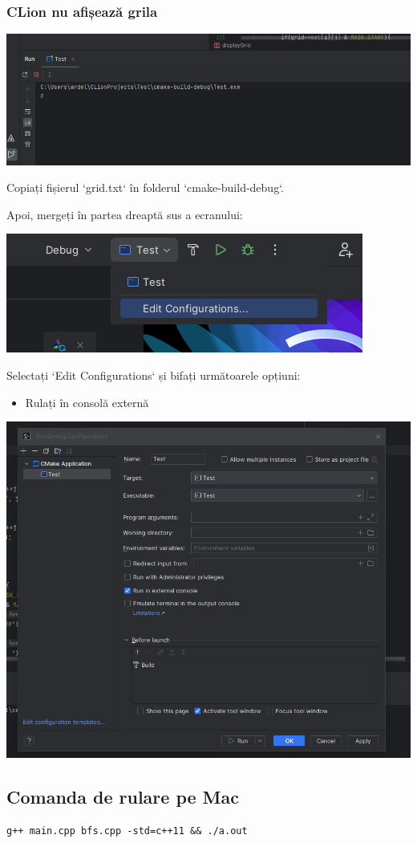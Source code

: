 \documentclass[../ro-fa-lab.tex]{subfiles}
\begin{document}
\subsubsection{CLion nu afișează grila}\label{clion-not-showing-grid}

\includegraphics[width=\textwidth,alt={A screenshot of a computer Description automatically generated}]{./Resources/tutorial_lab9/image25.png}

Copiați fișierul `grid.txt` în folderul `cmake-build-debug`.

Apoi, mergeți în partea dreaptă sus a ecranului:

\includegraphics[width=\textwidth,alt={A screenshot of a computer Description automatically generated}]{./Resources/tutorial_lab9/image26.png}

Selectați `Edit Configurations` și bifați următoarele opțiuni:

\begin{itemize}
\item
  Rulați în consolă externă
\end{itemize}

\includegraphics[width=\textwidth,alt={A screenshot of a computer Description automatically generated}]{./Resources/tutorial_lab9/image27.png}

\subsection{Comanda de rulare pe Mac}\label{mac-run-command}

\begin{verbatim}
g++ main.cpp bfs.cpp -std=c++11 && ./a.out
\end{verbatim}
\end{document}
